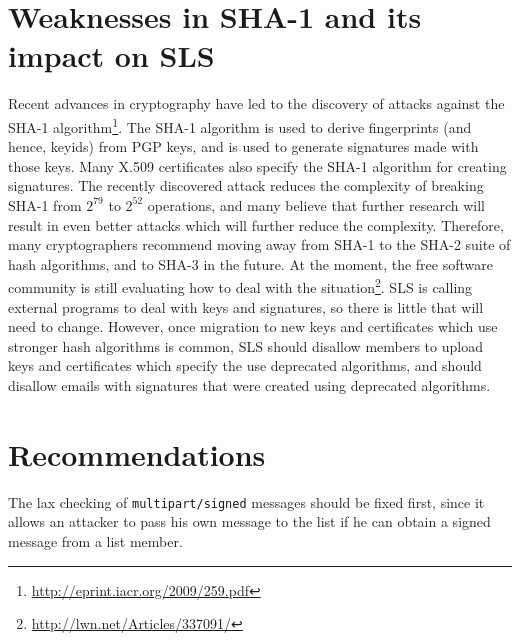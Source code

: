 \documentclass[a4]{article}
\newcommand{\mime}[1]{\texttt{#1}}
\begin{document}
\section{Weaknesses in SHA-1 and its impact on SLS}\label{sec:sha1}

Recent advances in cryptography have led to the discovery of attacks against the SHA-1
algorithm\footnote{\url{http://eprint.iacr.org/2009/259.pdf}}.
The SHA-1 algorithm is used to derive fingerprints (and hence, keyids) from PGP keys,
and is used to generate signatures made with those keys.
Many X.509 certificates also specify the SHA-1 algorithm for creating signatures.
The recently discovered attack reduces the complexity of breaking SHA-1 from $2^{79}$ to $2^{52}$ operations,
and many believe that further research will result in even better attacks which will further reduce the complexity.
Therefore, many cryptographers recommend moving away from SHA-1 to the SHA-2 suite of hash algorithms,
and to SHA-3 in the future.
At the moment, the free software community is still evaluating how to deal with the
situation\footnote{\url{http://lwn.net/Articles/337091/}}.
SLS is calling external programs to deal with keys and signatures,
so there is little that will need to change.
However, once migration to new keys and certificates which use stronger hash algorithms is common,
SLS should disallow members to upload keys and certificates which specify the use deprecated algorithms,
and should disallow emails with signatures that were created using deprecated algorithms.

\section{Recommendations}\label{sec:recommendations}

The lax checking of \mime{multipart/signed} messages should be fixed first,
since it allows an attacker to pass his own message to the list if he can obtain a signed message from a list member.
\end{document}
